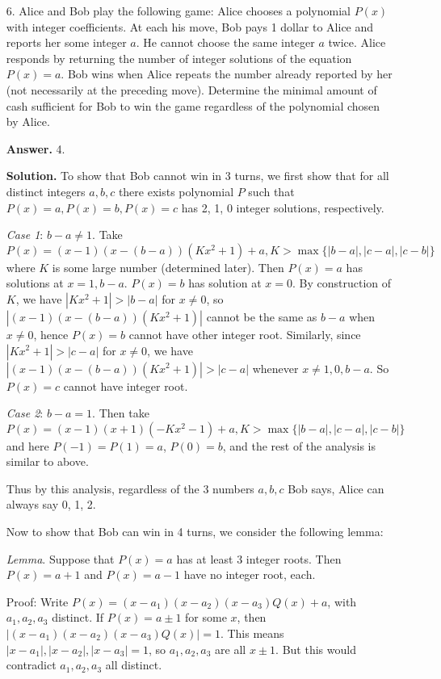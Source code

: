 \documentclass[11pt,a4paper]{article}
\begin{document}
\begin{enumerate}
	\item[6.]
	Alice and Bob play the following game: Alice chooses a polynomial $P(x)$ with
	integer coefficients. At each his move, Bob pays 1 dollar to Alice and reports her
	some integer $a$. He cannot choose the same integer $a$ twice. Alice responds by
	returning the number of integer solutions of the equation $P(x) = a$. Bob wins
	when Alice repeats the number already reported by her (not necessarily at the
	preceding move). Determine the minimal amount of cash sufficient for Bob to
	win the game regardless of the polynomial chosen by Alice.
	
	\textbf{Answer.} 4. 
	
	\textbf{Solution.} 
	To show that Bob cannot win in 3 turns, 
	we first show that for all distinct integers $a, b, c$ there exists polynomial $P$ such that 
	$P(x)=a, P(x)=b, P(x)=c$ has 2, 1, 0 integer solutions, respectively. 
	
	\emph{Case 1}: $b-a\neq 1$. Take 
	\[
	P(x)=(x-1)(x-(b-a))(Kx^2+1)+a, K>\max\{|b-a|, |c-a|, |c-b|\}
	\]
	where $K$ is some large number (determined later). 
	Then $P(x)=a$ has solutions at $x=1, b-a$. 
	$P(x)=b$ has solution at $x=0$. 
	By construction of $K$, we have $|Kx^2+1| > |b-a|$ for $x\neq 0$, 
	so $|(x-1)(x-(b-a))(Kx^2+1)|$ cannot be the same as $b-a$ when $x\neq 0$, 
	hence $P(x)=b$ cannot have other integer root. 
	Similarly, since $|Kx^2+1|>|c-a|$ for $x\neq 0$, 
	we have $|(x-1)(x-(b-a))(Kx^2+1)|>|c-a|$ whenever $x\neq 1, 0, b-a$. 
	So $P(x)=c$ cannot have integer root. 
	
	\emph{Case 2}: $b-a=1$. Then take 
	\[
	P(x)=(x-1)(x+1)(-Kx^2-1)+a, K>\max\{|b-a|, |c-a|, |c-b|\}
	\]
	and here $P(-1)=P(1)=a$, $P(0)=b$, and the rest of the analysis is similar to above. 
	
	Thus by this analysis, regardless of the 3 numbers $a, b, c$ Bob says, Alice can always say 0, 1, 2. 
	
	Now to show that Bob can win in 4 turns, we consider the following lemma: 
	
	\emph{Lemma}. Suppose that $P(x)=a$ has at least 3 integer roots. Then $P(x)=a+1$ and $P(x)=a-1$ have no integer root, each. 
	
	Proof: Write $P(x)=(x-a_1)(x-a_2)(x-a_3)Q(x)+a$, with $a_1, a_2, a_3$ distinct. 
	If $P(x)=a\pm 1$ for some $x$, then $|(x-a_1)(x-a_2)(x-a_3)Q(x)|=1$. 
	This means $|x-a_1|, |x-a_2|, |x-a_3|=1$, so $a_1, a_2, a_3$ are all $x\pm 1$. 
	But this would contradict $a_1, a_2, a_3$ all distinct. 
	

\end{enumerate}
\end{document}
